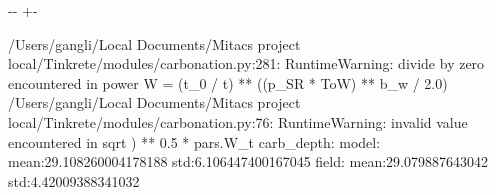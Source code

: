 \documentclass[letterpaper,10pt,english]{sphinxmanual}
\newlength\nbsphinxcodecellspacing
\begin{document}
{
\begin{sphinxVerbatim}[commandchars=\\\{\}]
\llap{\color{nbsphinxin}[8]:\,\hspace{\fboxrule}\hspace{\fboxsep}}
      

    

\end{sphinxVerbatim}
}

{

\kern-\sphinxverbatimsmallskipamount\kern-\baselineskip
\kern+\FrameHeightAdjust\kern-\fboxrule
\vspace{\nbsphinxcodecellspacing}

\begin{sphinxVerbatim}[commandchars=\\\{\}]
/Users/gangli/Local Documents/Mitacs project local/Tinkrete/modules/carbonation.py:281: RuntimeWarning: divide by zero encountered in power
  W = (t\_0 / t) ** ((p\_SR * ToW) ** b\_w / 2.0)
/Users/gangli/Local Documents/Mitacs project local/Tinkrete/modules/carbonation.py:76: RuntimeWarning: invalid value encountered in sqrt
  ) ** 0.5 * pars.W\_t
carb\_depth:
model:
mean:29.108260004178188
std:6.106447400167045
field:
mean:29.079887643042
std:4.42009388341032
\end{sphinxVerbatim}
}
\end{document}
